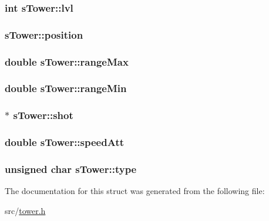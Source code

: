 \hypertarget{structs_tower_ac20e0db3500584704e60be50e8acf98f}{
\subsubsection[{lvl}]{\setlength{\rightskip}{0pt plus 5cm}int s\-Tower\-::lvl}}\label{structs_tower_ac20e0db3500584704e60be50e8acf98f}
\hypertarget{structs_tower_aaf5a4946b54c0dd20b83c494dcef2602}{
\subsubsection[{position}]{ s\-Tower\-::position}}\label{structs_tower_aaf5a4946b54c0dd20b83c494dcef2602}
\hypertarget{structs_tower_a62624df1e766b331cd575fa4e2640bbc}{
\subsubsection[{range\-Max}]{\setlength{\rightskip}{0pt plus 5cm}double s\-Tower\-::range\-Max}}\label{structs_tower_a62624df1e766b331cd575fa4e2640bbc}
\hypertarget{structs_tower_a337351f73af1fb962a111cd1b61df09b}{
\subsubsection[{range\-Min}]{\setlength{\rightskip}{0pt plus 5cm}double s\-Tower\-::range\-Min}}\label{structs_tower_a337351f73af1fb962a111cd1b61df09b}
\hypertarget{structs_tower_a3c9d5ef0a9853b968919775398307a23}{
\subsubsection[{shot}]{$\ast$ s\-Tower\-::shot}}\label{structs_tower_a3c9d5ef0a9853b968919775398307a23}
\hypertarget{structs_tower_aa5d34661ad01458c765a168ecd0e0a83}{
\subsubsection[{speed\-Att}]{\setlength{\rightskip}{0pt plus 5cm}double s\-Tower\-::speed\-Att}}\label{structs_tower_aa5d34661ad01458c765a168ecd0e0a83}
\hypertarget{structs_tower_a3891f13f52d26c0661d516777f847ff8}{
\subsubsection[{type}]{\setlength{\rightskip}{0pt plus 5cm}unsigned char s\-Tower\-::type}}\label{structs_tower_a3891f13f52d26c0661d516777f847ff8}


The documentation for this struct was generated from the following file\-:\begin{DoxyCompactItemize}
\item 
src/\hyperlink{tower_8h}{tower.\-h}\end{DoxyCompactItemize}
